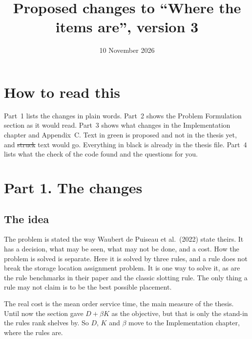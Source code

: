 \documentclass[11pt,a4paper]{article}
\title{Proposed changes to ``Where the items are'', version 3}
\date{10 November 2026}
\newcommand{\new}[1]{\textcolor{newc}{#1}}
\begin{document}
\maketitle

\section*{How to read this}
Part~1 lists the changes in plain words. Part~2 shows the Problem
Formulation section as it would read. Part~3 shows what changes in the
Implementation chapter and Appendix~C. Text in \new{green} is proposed and not
in the thesis yet, and \st{struck} text would go. Everything in black is
already in the thesis file. Part~4 lists what the check of the code found
and the questions for you.

\section*{Part 1. The changes}
\subsection*{The idea}
The problem is stated the way Waubert de Puiseau et al.\ (2022) state theirs.
It has a decision, what may be seen, what may not be done, and a cost. How
the problem is solved is separate. Here it is solved by three rules, and a
rule does not break the storage location assignment problem. It is one way
to solve it, as are the rule benchmarks in their paper and the classic
slotting rule. The only thing a rule may not claim is to be the best
possible placement.

The real cost is the mean order service time, the main measure of the
thesis. Until now the section gave $D + \beta K$ as the objective, but that
is only the stand-in the rules rank shelves by. So $D$, $K$ and $\beta$ move
to the Implementation chapter, where the rules are.
\end{document}
